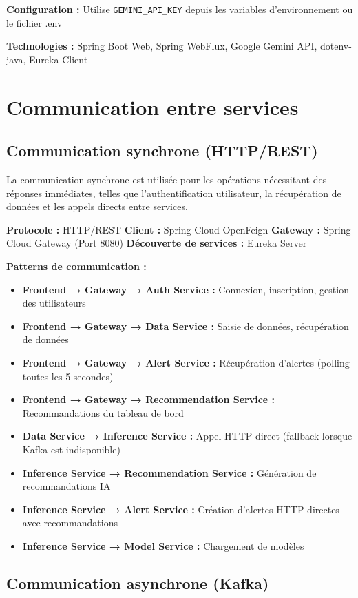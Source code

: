 \textbf{Configuration :} Utilise \texttt{GEMINI\_API\_KEY} depuis les variables d'environnement ou le fichier .env

\textbf{Technologies :} Spring Boot Web, Spring WebFlux, Google Gemini API, dotenv-java, Eureka Client

\section{Communication entre services}

\subsection{Communication synchrone (HTTP/REST)}

La communication synchrone est utilisée pour les opérations nécessitant des réponses immédiates, telles que l'authentification utilisateur, la récupération de données et les appels directs entre services.

\textbf{Protocole :} HTTP/REST
\textbf{Client :} Spring Cloud OpenFeign
\textbf{Gateway :} Spring Cloud Gateway (Port 8080)
\textbf{Découverte de services :} Eureka Server

\textbf{Patterns de communication :}
\begin{itemize}
    \item \textbf{Frontend → Gateway → Auth Service :} Connexion, inscription, gestion des utilisateurs
    \item \textbf{Frontend → Gateway → Data Service :} Saisie de données, récupération de données
    \item \textbf{Frontend → Gateway → Alert Service :} Récupération d'alertes (polling toutes les 5 secondes)
    \item \textbf{Frontend → Gateway → Recommendation Service :} Recommandations du tableau de bord
    \item \textbf{Data Service → Inference Service :} Appel HTTP direct (fallback lorsque Kafka est indisponible)
    \item \textbf{Inference Service → Recommendation Service :} Génération de recommandations IA
    \item \textbf{Inference Service → Alert Service :} Création d'alertes HTTP directes avec recommandations
    \item \textbf{Inference Service → Model Service :} Chargement de modèles
\end{itemize}

\subsection{Communication asynchrone (Kafka)}

